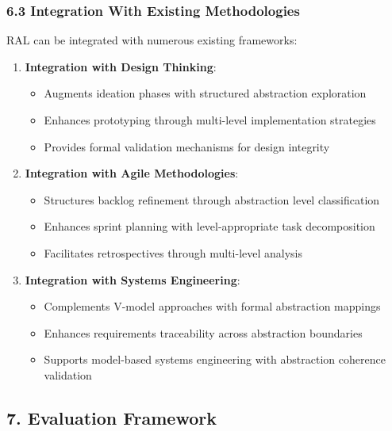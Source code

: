 \documentclass[
]{article}
\providecommand{\tightlist}{%
  \setlength{\itemsep}{0pt}\setlength{\parskip}{0pt}}
\begin{document}
\subsubsection{6.3 Integration With Existing
Methodologies}\label{integration-with-existing-methodologies}

RAL can be integrated with numerous existing frameworks:

\begin{enumerate}
\def\labelenumi{\arabic{enumi}.}
\tightlist
\item
  \textbf{Integration with Design Thinking}:

  \begin{itemize}
  \tightlist
  \item
    Augments ideation phases with structured abstraction exploration
  \item
    Enhances prototyping through multi-level implementation strategies
  \item
    Provides formal validation mechanisms for design integrity
  \end{itemize}
\item
  \textbf{Integration with Agile Methodologies}:

  \begin{itemize}
  \tightlist
  \item
    Structures backlog refinement through abstraction level
    classification
  \item
    Enhances sprint planning with level-appropriate task decomposition
  \item
    Facilitates retrospectives through multi-level analysis
  \end{itemize}
\item
  \textbf{Integration with Systems Engineering}:

  \begin{itemize}
  \tightlist
  \item
    Complements V-model approaches with formal abstraction mappings
  \item
    Enhances requirements traceability across abstraction boundaries
  \item
    Supports model-based systems engineering with abstraction coherence
    validation
  \end{itemize}
\end{enumerate}

\subsection{7. Evaluation Framework}\label{evaluation-framework}
\end{document}
